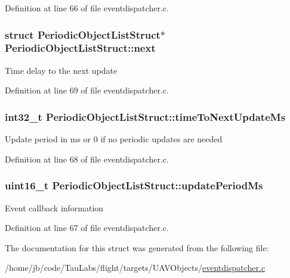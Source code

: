 \-Definition at line 66 of file eventdispatcher.\-c.

\hypertarget{struct_periodic_object_list_struct_a53ed6bc407c59100bcfddb3a49ccb88f}{
\subsubsection[{next}]{\setlength{\rightskip}{0pt plus 5cm}struct {\bf \-Periodic\-Object\-List\-Struct}$\ast$ {\bf \-Periodic\-Object\-List\-Struct\-::next}}}\label{struct_periodic_object_list_struct_a53ed6bc407c59100bcfddb3a49ccb88f}
\-Time delay to the next update 

\-Definition at line 69 of file eventdispatcher.\-c.

\hypertarget{struct_periodic_object_list_struct_ac03f97c098b138d52415563b1dd2b333}{
\subsubsection[{time\-To\-Next\-Update\-Ms}]{\setlength{\rightskip}{0pt plus 5cm}int32\-\_\-t {\bf \-Periodic\-Object\-List\-Struct\-::time\-To\-Next\-Update\-Ms}}}\label{struct_periodic_object_list_struct_ac03f97c098b138d52415563b1dd2b333}
\-Update period in ms or 0 if no periodic updates are needed 

\-Definition at line 68 of file eventdispatcher.\-c.

\hypertarget{struct_periodic_object_list_struct_a8473f34184b9b0caa6e10095501984f2}{
\subsubsection[{update\-Period\-Ms}]{\setlength{\rightskip}{0pt plus 5cm}uint16\-\_\-t {\bf \-Periodic\-Object\-List\-Struct\-::update\-Period\-Ms}}}\label{struct_periodic_object_list_struct_a8473f34184b9b0caa6e10095501984f2}
\-Event callback information 

\-Definition at line 67 of file eventdispatcher.\-c.



\-The documentation for this struct was generated from the following file\-:\begin{DoxyCompactItemize}
\item 
/home/jb/code/\-Tau\-Labs/flight/targets/\-U\-A\-V\-Objects/\hyperlink{eventdispatcher_8c}{eventdispatcher.\-c}\end{DoxyCompactItemize}
